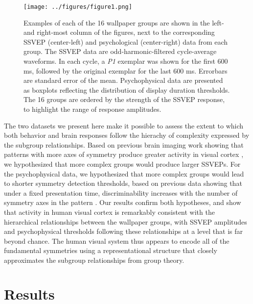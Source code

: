 \documentclass[11pt, twoside]{article}
\begin{document}
\begin{figure}[hp]
\centering
\texttt{[image: ../figures/figure1.png]}
\caption{Examples of each of the 16 wallpaper groups are shown in the left- and right-most column of the figures, next to the corresponding SSVEP (center-left) and psychological (center-right) data from each group. The SSVEP data are odd-harmonic-filtered cycle-average waveforms. In each cycle, a \textit{P1} exemplar was shown for the first 600 ms, followed by the original exemplar for the last 600 ms. Errorbars are standard error of the mean. Psychophysical data are presented as boxplots reflecting the distribution of display duration thresholds. The 16 groups are ordered by the strength of the SSVEP response, to highlight the range of response amplitudes.}
\label{fig:example_stimuli}
\end{figure}

The two datasets we present here make it possible to assess the extent to which both behavior and brain responses follow the hierachy of complexity expressed by the subgroup relationships. Based on previous brain imaging work showing that patterns with more axes of symmetry produce greater activity in visual cortex \cite{RN1170, RN1959, RN1725, keefe_2018}, we hypothesized that more complex groups would produce larger SSVEPs. For the psychophysical data, we hypothesized that more complex groups would lead to shorter symmetry detection thresholds, based on previous data showing that under a fixed presentation time, discriminability increases with the number of symmetry axes in the pattern \cite{wagemans_1991}. Our results confirm both hypotheses, and show that activity in human visual cortex is remarkably consistent with the hierarchical relationships between the wallpaper groups, with SSVEP amplitudes and psychophysical thresholds following these relationships at a level that is far beyond chance. The human visual system thus appears to encode all of the fundamental symmetries using a representational structure that closely approximates the subgroup relationships from group theory.

\section*{Results}
\end{document}
